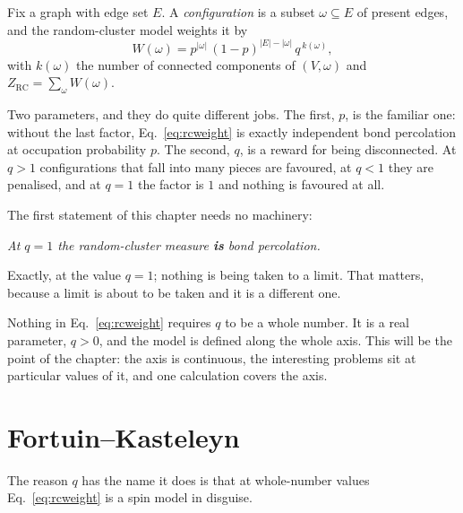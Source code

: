 Fix a graph with edge set $E$. A \emph{configuration} is a subset
$\omega\subseteq E$ of present edges, and the random-cluster model
\citep{fortuin1972} weights it by
\begin{equation}
  W(\omega)=p^{|\omega|}\,(1-p)^{|E|-|\omega|}\,q^{\,k(\omega)},
  \label{eq:rcweight}
\end{equation}
with $k(\omega)$ the number of connected components of $(V,\omega)$ and
$Z_{\mathrm{RC}}=\sum_{\omega}W(\omega)$.

Two parameters, and they do quite different jobs. The first, $p$, is the
familiar one: without the last factor, Eq.~\eqref{eq:rcweight} is exactly
independent bond percolation at occupation probability $p$. The second, $q$, is
a reward for being disconnected. At $q>1$ configurations that fall into many
pieces are favoured, at $q<1$ they are penalised, and at $q=1$ the factor is
$1$ and nothing is favoured at all.

The first statement of this chapter needs no machinery:

\begin{center}
\emph{At $q=1$ the random-cluster measure \textbf{is} bond percolation.}
\end{center}

Exactly, at the value $q=1$; nothing is being taken to a limit. That matters,
because a limit is about to be taken and it is a different one.

Nothing in Eq.~\eqref{eq:rcweight} requires $q$ to be a whole number. It is a
real parameter, $q>0$, and the model is defined along the whole axis. This will
be the point of the chapter: the axis is continuous, the interesting problems
sit at particular values of it, and one calculation covers the axis.

\section{Fortuin--Kasteleyn}
\label{sec:fk}

The reason $q$ has the name it does is that at whole-number values
Eq.~\eqref{eq:rcweight} is a spin model in disguise.


